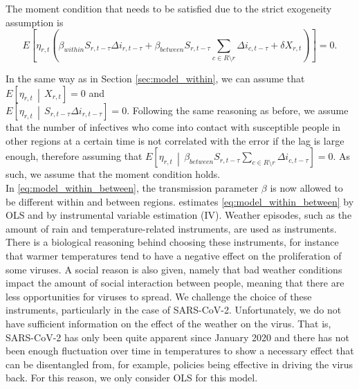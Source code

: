 \documentclass[12pt]{article}
\begin{document}
	The moment condition that needs to be satisfied due to the strict exogeneity assumption is
	    \[E\left[ \eta_{r,t} \left( \beta_{within} S_{r,t-\tau} \Delta i_{r,t-\tau}  + \beta_{between}S_{r,t-\tau} \sum_{c \in R \setminus r} \Delta i_{c, t-\tau} + \delta X_{r,t} \right) \right] = 0.\]
	    
	In the same way as in Section \ref{sec:model_within}, we can assume that $E\left[\eta_{r,t} \,\middle|\, X_{r,t}\right] = 0$ and \\
	$E\left[\eta_{r,t} \,\middle|\, S_{r,t-\tau} \Delta i_{r,t-\tau}\right] = 0$. Following the same reasoning as before, we assume that the number of infectives who come into contact with susceptible people in other regions at a certain time is not correlated with the error if the lag is large enough, therefore assuming that $E\left[\eta_{r,t} \,\middle|\, \beta_{between}S_{r,t-\tau} \sum_{c \in R \setminus r} \Delta i_{c, t-\tau}\right] = 0$. As such, we assume that the moment condition holds. \\
	
	In \eqref{eq:model_within_between}, the transmission parameter $\beta$ is now allowed to be different within and between regions. \textcite{adda2016economic} estimates \eqref{eq:model_within_between} by OLS and by instrumental variable estimation (IV). Weather episodes, such as the amount of rain and temperature-related instruments, are used as instruments. There is a biological reasoning behind choosing these instruments, for instance that warmer temperatures tend to have a negative effect on the proliferation of some viruses. A social reason is also given, namely that bad weather conditions impact the amount of social interaction between people, meaning that there are less opportunities for viruses to spread. We challenge the choice of these instruments, particularly in the case of SARS-CoV-2. Unfortunately, we do not have sufficient information on the effect of the weather on the virus. That is, SARS-CoV-2 has only been quite apparent since January 2020 and there has not been enough fluctuation over time in temperatures to show a necessary effect that can be disentangled from, for example, policies being effective in driving the virus back. For this reason, we only consider OLS for this model.
	
\end{document}
